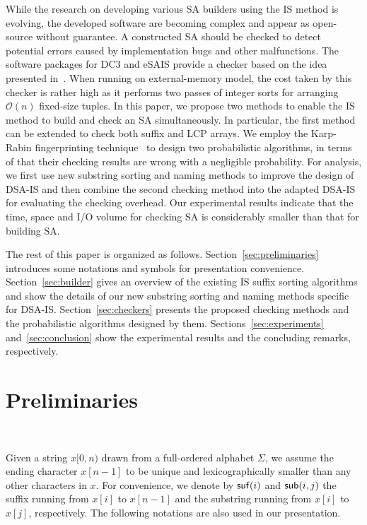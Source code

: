 \documentclass[10pt,journal,compsoc]{IEEEtran}
\begin{document}
While the research on developing various SA builders using the IS method is evolving, the developed software are becoming complex and appear as open-source without guarantee. A constructed SA should be checked to detect potential errors caused by implementation bugs and other malfunctions. The software packages for DC3 and eSAIS provide a checker based on the idea presented in~\cite{Dementiev2008a}. When running on external-memory model, the cost taken  by this checker is rather high as it performs two passes of integer sorts for arranging $\mathcal{O}(n)$ fixed-size tuples. In this paper, we propose two methods to enable the IS method to build and check an SA simultaneously. In particular, the first method can be extended to check both suffix and LCP arrays. We employ the Karp-Rabin fingerprinting technique~\cite{Karp1987} to design two probabilistic algorithms, in terms of that their checking results are wrong with a negligible probability. For analysis, we first use new substring sorting and naming methods to improve the design of DSA-IS and then combine the second checking method into the adapted DSA-IS for evaluating the checking overhead. Our experimental results indicate that the time, space and I/O volume for checking SA is considerably smaller than that for building SA.

The rest of this paper is organized as follows. Section~\ref{sec:preliminaries} introduces some notations and symbols for presentation convenience. Section~\ref{sec:builder} gives an overview of the existing IS suffix sorting algorithms and show the details of our new substring sorting and naming methods specific for DSA-IS. Section~\ref{sec:checkers} presents the proposed checking methods and the probabilistic algorithms designed by them. Sections~\ref{sec:experiments} and~\ref{sec:conclusion} show the experimental results and the concluding remarks, respectively.

\section{Preliminaries}~\label{sec:preliminaries}

Given a string $x[0,n)$ drawn from a full-ordered alphabet $\Sigma$, we assume the ending character $x[n - 1]$ to be unique and lexicographically smaller than any other characters in $x$. For convenience, we denote by ${\sf suf}(i)$ and ${\sf sub}(i, j)$ the suffix running from $x[i]$ to $x[n-  1]$ and the substring running from $x[i]$ to $x[j]$, respectively. The following notations are also used in our presentation.
\end{document}
